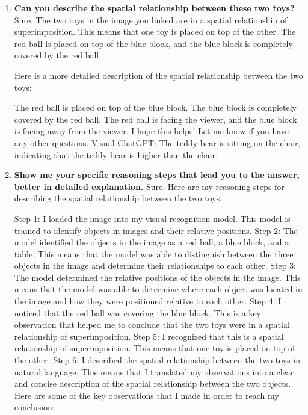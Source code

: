     \begin{enumerate}
        \item \textbf{Can you describe the spatial relationship between these two toys?}
        \subitem 
        Sure. The two toys in the image you linked are in a spatial relationship of superimposition. This means that one toy is placed on top of the other. The red ball is placed on top of the blue block, and the blue block is completely covered by the red ball.
        
        Here is a more detailed description of the spatial relationship between the two toys:
        
        The red ball is placed on top of the blue block.
        The blue block is completely covered by the red ball.
        The red ball is facing the viewer, and the blue block is facing away from the viewer.
        I hope this helps! Let me know if you have any other questions.
        \subitem Visual ChatGPT: The teddy bear is sitting on the chair, indicating that the teddy bear is higher than the chair.
        \item \textbf{Show me your specific reasoning steps that lead you to the answer, better in detailed explanation.}
        \subitem Sure. Here are my reasoning steps for describing the spatial relationship between the two toys:

        Step 1: I loaded the image into my visual recognition model. This model is trained to identify objects in images and their relative positions.
        Step 2: The model identified the objects in the image as a red ball, a blue block, and a table. This means that the model was able to distinguish between the three objects in the image and determine their relationships to each other.
        Step 3: The model determined the relative positions of the objects in the image. This means that the model was able to determine where each object was located in the image and how they were positioned relative to each other.
        Step 4: I noticed that the red ball was covering the blue block. This is a key observation that helped me to conclude that the two toys were in a spatial relationship of superimposition.
        Step 5: I recognized that this is a spatial relationship of superimposition. This means that one toy is placed on top of the other.
        Step 6: I described the spatial relationship between the two toys in natural language. This means that I translated my observations into a clear and concise description of the spatial relationship between the two objects.
        Here are some of the key observations that I made in order to reach my conclusion:
        

\end{enumerate}
